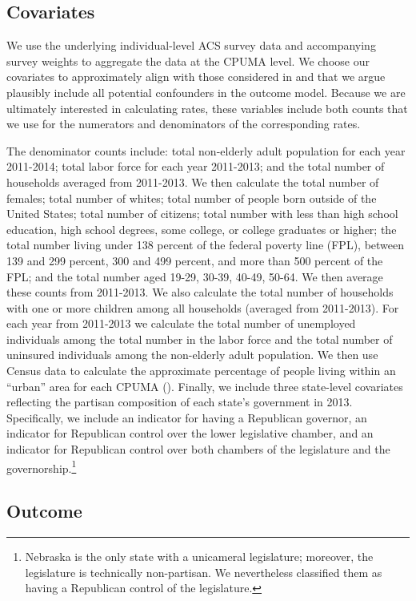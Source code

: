 \documentclass[12pt]{article}
\begin{document}
\subsection{Covariates}

We use the underlying individual-level ACS survey data and accompanying survey weights to aggregate the data at the CPUMA level. We choose our covariates to approximately align with those considered in \cite{courtemanche2017early} and that we argue plausibly include all potential confounders in the outcome model. Because we are ultimately interested in calculating rates, these variables include both counts that we use for the numerators and denominators of the corresponding rates. 

The denominator counts include: total non-elderly adult population for each year 2011-2014; total labor force for each year 2011-2013; and the total number of households averaged from 2011-2013. We then calculate the total number of females; total number of whites; total number of people born outside of the United States; total number of citizens; total number with less than high school education, high school degrees, some college, or college graduates or higher; the total number living under 138 percent of the federal poverty line (FPL), between 139 and 299 percent, 300 and 499 percent, and more than 500 percent of the FPL; and the total number aged 19-29, 30-39, 40-49, 50-64. We then average these counts from 2011-2013. We also calculate the total number of households with one or more children among all households (averaged from 2011-2013). For each year from 2011-2013 we calculate the total number of unemployed individuals among the total number in the labor force and the total number of uninsured individuals among the non-elderly adult population. We then use Census data to calculate the approximate percentage of people living within an ``urban'' area for each CPUMA (\cite{census}). Finally, we include three state-level covariates reflecting the partisan composition of each state's government in 2013. Specifically, we include an indicator for having a Republican governor, an indicator for Republican control over the lower legislative chamber, and an indicator for Republican control over both chambers of the legislature and the governorship.\footnote{Nebraska is the only state with a unicameral legislature; moreover, the legislature is technically non-partisan. We nevertheless classified them as having a Republican control of the legislature.} 

\subsection{Outcome}
\end{document}
